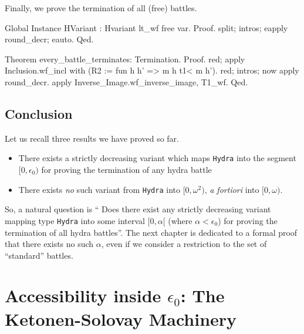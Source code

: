 Finally, we prove the termination of all (free) battles.

\label{thm:every-battle-terminates}

\begin{Coqsrc}
Global Instance HVariant : Hvariant lt_wf free var.
Proof.
 split; intros; eapply round_decr; eauto.
Qed.

Theorem every_battle_terminates: Termination.
Proof. 
  red; apply Inclusion.wf_incl with 
         (R2 := fun h h' =>  m h t1< m h').
   red; intros;  now apply round_decr.
   apply Inverse_Image.wf_inverse_image, T1_wf.
Qed.
\end{Coqsrc}


\section*{Conclusion}

Let us recall three results we have proved so far.
\begin{itemize}
\item There exists a strictly decreasing variant which maps \texttt{Hydra} into 
the segment $[0,\epsilon_0)$ for proving the termination of any hydra battle
\item There exists \emph{no} such variant from \texttt{Hydra} into 
$[0,\omega^2)$, \emph{a fortiori} into $[0,\omega)$.
\end{itemize}

So, a  natural question is `` Does there exist any strictly decreasing variant mapping
type \texttt{Hydra} into some interval $[0,\alpha[$ (where $\alpha <\epsilon_0$) for proving the termination of all hydra battles''. The next chapter is dedicated to a formal proof that there exists no such $\alpha$, even if we consider a restriction to the set of ``standard'' battles.






%


%





\chapter[The Ketonen-Solovay machinery]{Accessibility inside \texorpdfstring{$\epsilon_0$}{Epsilon0}: The Ketonen-Solovay Machinery\label{ks-chapter}}
\label{chap:ketonen}

